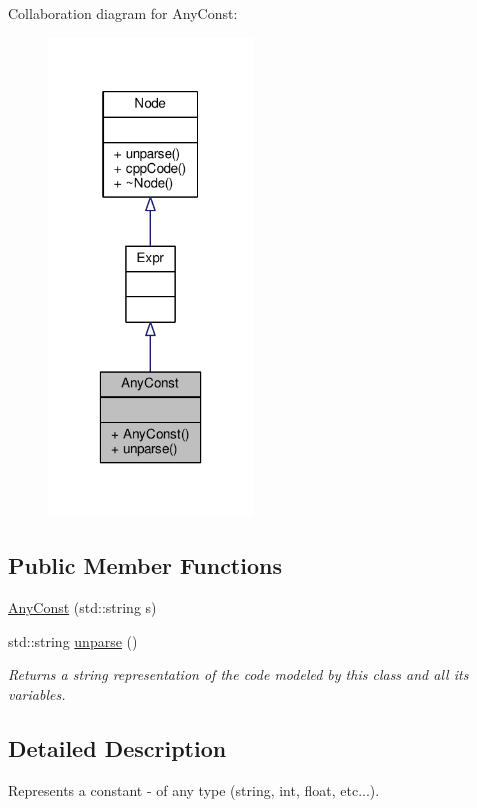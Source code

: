 Collaboration diagram for Any\-Const\-:\nopagebreak
\begin{figure}[H]
\begin{center}
\leavevmode
\includegraphics[width=154pt]{classAnyConst__coll__graph}
\end{center}
\end{figure}
\subsection*{Public Member Functions}
\begin{DoxyCompactItemize}
\item 
\hyperlink{classAnyConst_a2ae9135a82a8954e22765ecfec832eea}{Any\-Const} (std\-::string s)
\item 
std\-::string \hyperlink{classAnyConst_a2c4a9d1499b29bde8e72650cae459716}{unparse} ()
\begin{DoxyCompactList}\small\item\em Returns a string representation of the code modeled by this class and all its variables. \end{DoxyCompactList}\end{DoxyCompactItemize}


\subsection{Detailed Description}
Represents a constant -\/ of any type (string, int, float, etc...). \par
 

